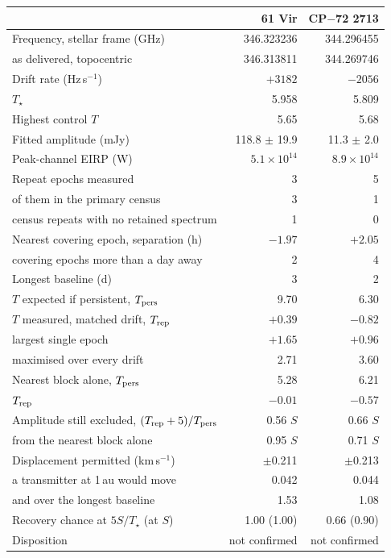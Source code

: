 \begin{tabular}{@{}>{\raggedright\arraybackslash}p{}@{~~}r@{~~}r@{}}
\hline
 & 61 Vir & CP$-$72 2713 \\
\hline
Frequency, stellar frame (GHz) & 346.323236 & 344.296455 \\
\quad as delivered, topocentric & 346.313811 & 344.269746 \\
Drift rate (Hz\,s$^{-1}$) & $+3182$ & $-2056$ \\
$T_\star$ & 5.958 & 5.809 \\
Highest control $T$ & 5.65 & 5.68 \\
Fitted amplitude (mJy) & 118.8 $\pm$ 19.9 & 11.3 $\pm$ 2.0 \\
Peak-channel EIRP (W) & $5.1 \times 10^{14}$ & $8.9 \times 10^{14}$ \\
Repeat epochs measured & 3 & 5 \\
\quad of them in the primary census & 3 & 1 \\
\quad census repeats with no retained spectrum & 1 & 0 \\
Nearest covering epoch, separation (h) & $-1.97$ & $+2.05$ \\
\quad covering epochs more than a day away & 2 & 4 \\
Longest baseline (d) & 3 & 2 \\
$T$ expected if persistent, $T_{\rm pers}$ & 9.70 & 6.30 \\
$T$ measured, matched drift, $T_{\rm rep}$ & $+0.39$ & $-0.82$ \\
\quad largest single epoch & $+1.65$ & $+0.96$ \\
\quad maximised over every drift & 2.71 & 3.60 \\
Nearest block alone, $T_{\rm pers}$ & 5.28 & 6.21 \\
\quad $T_{\rm rep}$ & $-0.01$ & $-0.57$ \\
Amplitude still excluded, $(T_{\rm rep}+5)/T_{\rm pers}$ & 0.56 $S$ & 0.66 $S$ \\
\quad from the nearest block alone & 0.95 $S$ & 0.71 $S$ \\
Displacement permitted (km\,s$^{-1}$) & $\pm$0.211 & $\pm$0.213 \\
\quad a transmitter at 1\,au would move & 0.042 & 0.044 \\
\quad and over the longest baseline & 1.53 & 1.08 \\
Recovery chance at $5S/T_\star$ (at $S$) & 1.00 (1.00) & 0.66 (0.90) \\
Disposition & not confirmed & not confirmed \\
\hline
\end{tabular}
